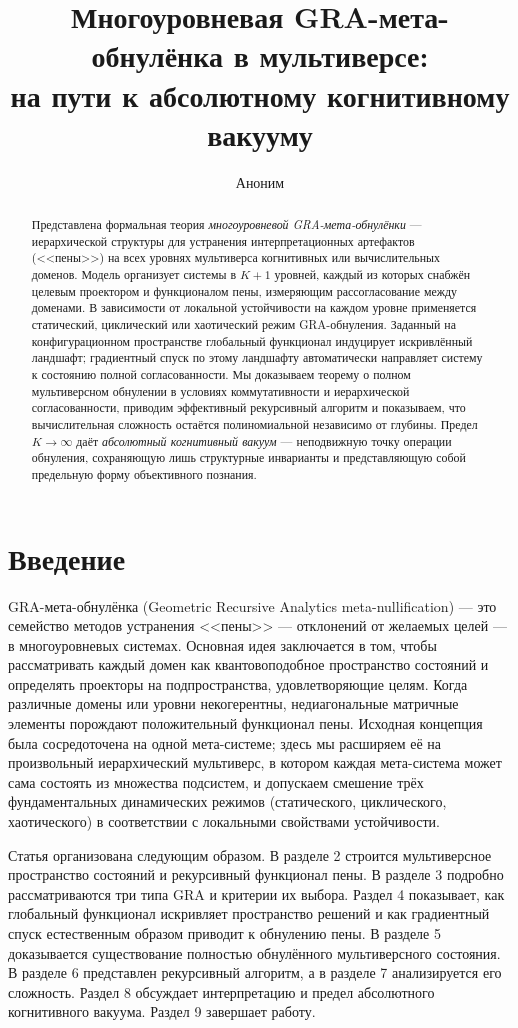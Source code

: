 \documentclass[12pt,a4paper]{article}
\title{\textbf{Многоуровневая GRA-мета-обнулёнка в мультиверсе:\\
на пути к абсолютному когнитивному вакууму}}
\author{Аноним}
\date{}
\begin{document}
\maketitle

\begin{abstract}
Представлена формальная теория \emph{многоуровневой GRA-мета-обнулёнки} — иерархической структуры для устранения интерпретационных артефактов (<<пены>>) на всех уровнях мультиверса когнитивных или вычислительных доменов. Модель организует системы в $K+1$ уровней, каждый из которых снабжён целевым проектором и функционалом пены, измеряющим рассогласование между доменами. В зависимости от локальной устойчивости на каждом уровне применяется статический, циклический или хаотический режим GRA-обнуления. Заданный на конфигурационном пространстве глобальный функционал индуцирует искривлённый ландшафт; градиентный спуск по этому ландшафту автоматически направляет систему к состоянию полной согласованности. Мы доказываем теорему о полном мультиверсном обнулении в условиях коммутативности и иерархической согласованности, приводим эффективный рекурсивный алгоритм и показываем, что вычислительная сложность остаётся полиномиальной независимо от глубины. Предел $K\to\infty$ даёт \emph{абсолютный когнитивный вакуум} — неподвижную точку операции обнуления, сохраняющую лишь структурные инварианты и представляющую собой предельную форму объективного познания.
\end{abstract}

\section{Введение}
GRA-мета-обнулёнка (Geometric Recursive Analytics meta-nullification) — это семейство методов устранения <<пены>> — отклонений от желаемых целей — в многоуровневых системах. Основная идея заключается в том, чтобы рассматривать каждый домен как квантовоподобное пространство состояний и определять проекторы на подпространства, удовлетворяющие целям. Когда различные домены или уровни некогерентны, недиагональные матричные элементы порождают положительный функционал пены. Исходная концепция была сосредоточена на одной мета-системе; здесь мы расширяем её на произвольный иерархический мультиверс, в котором каждая мета-система может сама состоять из множества подсистем, и допускаем смешение трёх фундаментальных динамических режимов (статического, циклического, хаотического) в соответствии с локальными свойствами устойчивости.

Статья организована следующим образом. В разделе 2 строится мультиверсное пространство состояний и рекурсивный функционал пены. В разделе 3 подробно рассматриваются три типа GRA и критерии их выбора. Раздел 4 показывает, как глобальный функционал искривляет пространство решений и как градиентный спуск естественным образом приводит к обнулению пены. В разделе 5 доказывается существование полностью обнулённого мультиверсного состояния. В разделе 6 представлен рекурсивный алгоритм, а в разделе 7 анализируется его сложность. Раздел 8 обсуждает интерпретацию и предел абсолютного когнитивного вакуума. Раздел 9 завершает работу.
\end{document}
